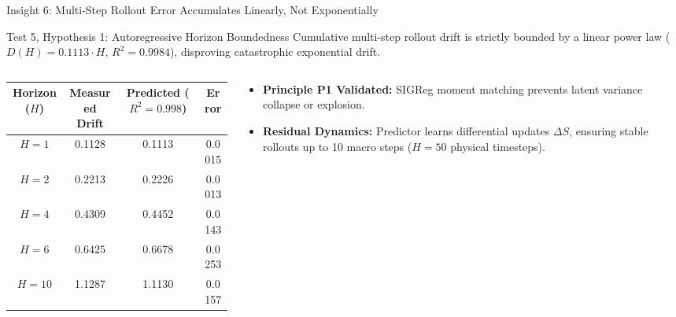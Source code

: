 \documentclass[aspectratio=169, 10pt]{beamer}
\begin{document}
\begin{frame}{Insight 6: Multi-Step Rollout Error Accumulates Linearly, Not Exponentially}
  \begin{block}{Test 5, Hypothesis 1: Autoregressive Horizon Boundedness}
    Cumulative multi-step rollout drift is strictly bounded by a linear power law ($D(H) = 0.1113 \cdot H$, \textbf{$R^2 = 0.9984$}), disproving catastrophic exponential drift.
  \end{block}
  \vspace{-0.2cm}
  \begin{columns}[T]
    \begin{column}{0.52\textwidth}
      \setlength{\tabcolsep}{3pt}
      \begin{table}
        \centering
        \scriptsize
        \begin{tabular}{cccc}
          \toprule
          \textbf{Horizon ($H$)} & \textbf{Measured Drift} & \textbf{Predicted ($R^2=0.998$)} & \textbf{Error} \\
          \midrule
          $H = 1$ & 0.1128 & 0.1113 & 0.0015 \\
          $H = 2$ & 0.2213 & 0.2226 & 0.0013 \\
          $H = 4$ & 0.4309 & 0.4452 & 0.0143 \\
          $H = 6$ & 0.6425 & 0.6678 & 0.0253 \\
          $H = 10$ & 1.1287 & 1.1130 & 0.0157 \\
          \bottomrule
        \end{tabular}
      \end{table}
    \end{column}
    \begin{column}{0.46\textwidth}
      \begin{itemize}
        \item \textbf{Principle P1 Validated:} SIGReg moment matching prevents latent variance collapse or explosion.
        \item \textbf{Residual Dynamics:} Predictor learns differential updates $\Delta S$, ensuring stable rollouts up to 10 macro steps ($H=50$ physical timesteps).
      \end{itemize}
    \end{column}
  \end{columns}
\end{frame}
\end{document}
